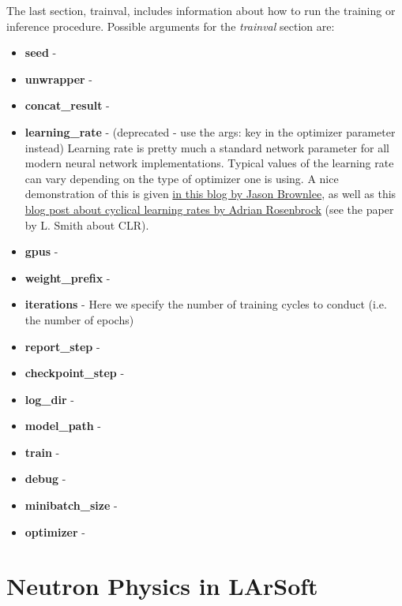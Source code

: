 \documentclass[8pt]{refart}
\begin{document}
The last section, trainval, includes information about how to run the training or inference procedure.  Possible arguments for the \textit{trainval} section are:
\begin{itemize}
    \item \textbf{seed} - 
    \item \textbf{unwrapper} - 
    \item \textbf{concat\_result} - 
    \item \textbf{learning\_rate} - (deprecated - use the args: key in the optimizer parameter instead) Learning rate is pretty much a standard network parameter for all modern neural network implementations.  Typical values of the learning rate can vary depending on the type of optimizer one is using.  A nice demonstration of this is given \href{https://machinelearningmastery.com/understand-the-dynamics-of-learning-rate-on-deep-learning-neural-networks/}{in this blog by Jason Brownlee}, as well as this \href{https://machinelearningmastery.com/understand-the-dynamics-of-learning-rate-on-deep-learning-neural-networks/}{blog post about cyclical learning rates by Adrian Rosenbrock} (see the paper by L. Smith \cite{Smith} about CLR).
    \item \textbf{gpus} - 
    \item \textbf{weight\_prefix} - 
    \item \textbf{iterations} - Here we specify the number of training cycles to conduct (i.e. the number of epochs)
    \item \textbf{report\_step} - 
    \item \textbf{checkpoint\_step} - 
    \item \textbf{log\_dir} - 
    \item \textbf{model\_path} - 
    \item \textbf{train} - 
    \item \textbf{debug} - 
    \item \textbf{minibatch\_size} - 
    \item \textbf{optimizer} - 
\end{itemize}



\section{Neutron Physics in LArSoft}
\end{document}
